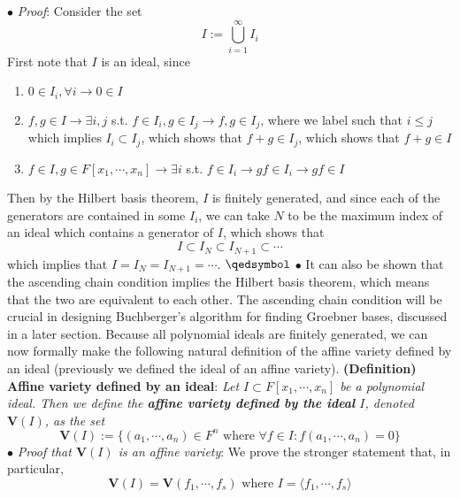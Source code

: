 \documentclass{article}
\begin{document}
\newline
\indent $ \bullet $ \textit{Proof}: Consider the set
$$ I := \bigcup_{i = 1}^\infty I_i $$
\indent First note that $ I $ is an ideal, since 
\begin{enumerate}
	\item $ 0 \in I_i, \forall i \rightarrow 0 \in I $
	\item $ f, g \in I \rightarrow \exists i, j $ s.t. $ f \in I_i, g \in I_j \rightarrow f, g \in I_j $, where we label such that $ i \leq j $ which implies $ I_i \subset I_j $, which shows that $ f + g \in I_j $, which shows that $ f + g \in I $
	\item $ f \in I, g \in F[x_1, \cdots, x_n] \rightarrow \exists i $ s.t. $ f \in I_i \rightarrow g f \in I_i \rightarrow g f \in I $
\end{enumerate}
Then by the Hilbert basis theorem, $ I $ is finitely generated, and since each of the generators are contained in some $ I_i $, we can take $ N $ to be the maximum index of an ideal which contains a generator of $ I $, which shows that
$$ I \subset I_N \subset I_{N + 1} \subset \cdots $$
which implies that $ I = I_N = I_{N + 1} = \cdots $. $ \qedsymbol $
\newline
\indent $ \bullet $ It can also be shown that the ascending chain condition implies the Hilbert basis theorem, which means that the two are equivalent to each other. The ascending chain condition will be crucial in designing Buchberger's algorithm for finding Groebner bases, discussed in a later section.
\newline \newline
Because all polynomial ideals are finitely generated, we can now formally make the following natural definition of the affine variety defined by an ideal (previously we defined the ideal of an affine variety).
\newline \newline
\textbf{(Definition) Affine variety defined by an ideal}: \textit{Let $ I \subset F[x_1, \cdots, x_n] $ be a polynomial ideal. Then we define the \textbf{affine variety defined by the ideal} $ I $, denoted $ \mathbf{V}(I) $, as the set}
$$ \mathbf{V}(I) := \{ (a_1, \cdots, a_n) \in F^n \text{ where } \forall f \in I: f(a_1, \cdots, a_n) = 0 \} $$
\newline
\indent $ \bullet $ \textit{Proof that $ \mathbf{V}(I) $ is an affine variety}: We prove the stronger statement that, in particular,
$$ \mathbf{V}(I) = \mathbf{V}(f_1, \cdots, f_s) \text{ where } I = \langle f_1, \cdots, f_s \rangle $$
\end{document}
